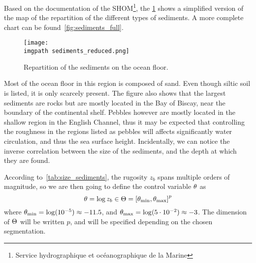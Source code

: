 \documentclass[../../Main_ManuscritThese.tex]{subfiles}
\newcommand{\zob}{z_b}
\newcommand\imgpath{/home/victor/acadwriting/Manuscrit/Text/Chapter5/img/}
\begin{document}
Based on the documentation of the SHOM\footnote{Service hydrographique
  et océanographique de la Marine}, the \cref{fig:sediments_reduced}
shows a simplified version of the map of the repartition of the
different types of sediments. A more complete chart can be
found~\cref{fig:sediments_full}.
\begin{figure}[ht]
  \centering
  \texttt{[image: \\imgpath sediments\_reduced.png]}
  \caption{\label{fig:sediments_reduced} Repartition of the sediments
    on the ocean floor.}
\end{figure}

Most of the ocean floor in this region is composed of sand. Even
though siltic soil is listed, it is only scarcely present. The figure
also shows that the largest sediments are rocks but are mostly located
in the Bay of Biscay, near the boundary of the continental
shelf. Pebbles however are mostly located in the shallow region in the
English Channel, thus it may be expected that controlling the
roughness in the regions listed as pebbles will affects significantly
water circulation, and thus the sea surface height. Incidentally, we
can notice the inverse correlation between the size of the sediments,
and the depth at which they are found.

According to~\cref{tab:size_sediments}, the rugosity $\zob$ spans
multiple orders of magnitude, so we are then going to define the control
variable $\theta$ as
\begin{equation}
  \kk = \log \zob \in \Kspace = \interval{\kk_{\min}}{\kk_{\max}}^p
\end{equation}
where $\theta_{\min} = \log(10^{-5}) \approx -11.5$, and
$\theta_{\max} = \log(5\cdot 10^{-2}) \approx -3$.  The dimension of
$\Theta$ will be written $p$, and will be specified depending on the
chosen segmentation.
\end{document}
